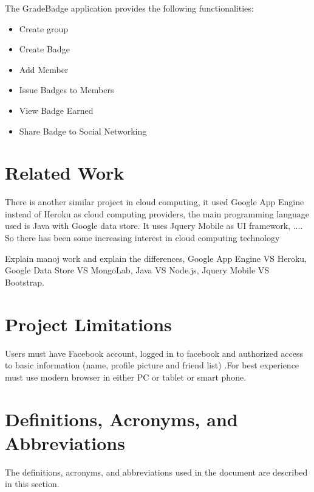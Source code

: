 The GradeBadge application provides the following functionalities:
\begin{itemize}
\item Create group
\item Create Badge 
\item Add Member
\item Issue Badges to Members
\item View Badge Earned
\item Share Badge to Social Networking 
\end{itemize}

\section{Related Work}
There is another similar project in cloud computing, it used Google App Engine instead of Heroku as cloud computing providers, the main programming language used is Java with Google data store. It uses Jquery Mobile as UI framework, ....
So there has been some increasing interest in cloud computing technology  

Explain manoj work and explain the differences, Google App Engine VS Heroku, Google Data Store VS MongoLab, Java VS Node.js, Jquery Mobile VS Bootstrap. \cite{Manoj}

\section{Project Limitations}
Users must have Facebook account,  logged in to facebook and authorized access to basic information (name, profile picture and friend list) .For best experience must use modern browser in either PC or tablet or smart phone.    

\section{Definitions, Acronyms, and Abbreviations}

The definitions, acronyms, and abbreviations used in the document are described in this section.

